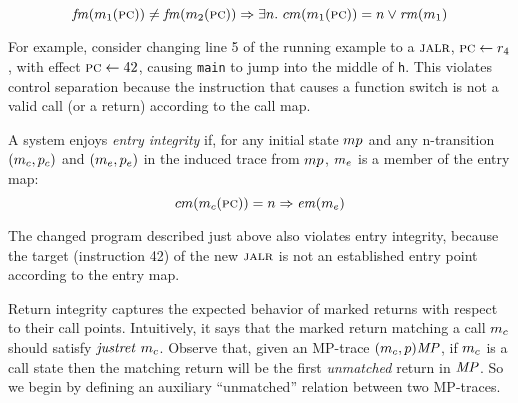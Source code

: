\documentclass[acmsmall,review,anonymous]{acmart}\settopmatter{printfolios=true,printccs=false,printacmref=false}
\begin{document}
\[ \mathit{fm}(m_1(\textsc{pc})) \not = \mathit{fm}(m_2(\textsc{pc})) \Rightarrow
\exists n. ~ cm(m_1(\textsc{pc})) = n \vee
\mathit{rm}(m_1) \]

For example, consider changing line 5 of the running example to a $\textsc{jalr}$,
$\textsc{pc} \leftarrow r_4$, with effect $\textsc{pc} \leftarrow 42$, causing {\tt main}
to jump into the middle of {\tt h}.
This violates control separation because the instruction that causes a
function switch is not a valid call (or a return) according to the
call map.

A system enjoys {\em entry integrity}
if, for any initial state $mp$
and any n-transition \((m_c,p_c)\) and
\((m_e, p_e)\) in the induced trace from
$mp$, $m_e$ is a member of the entry map:
\[cm(m_c(\textsc{pc})) = n \Rightarrow \mathit{em}(m_e)\]

The changed program described just above also violates entry integrity,
because the target (instruction 42) of the new $\textsc{jalr}$ is not an established entry point
according to the entry map.


\newcommand*{\Unmatched}{\mathit{um}}

Return integrity captures the expected behavior of marked returns with
respect to their call points. Intuitively, it says that the marked return
matching a call $m_c$ should satisfy $\mathit{justret}\ m_c$.
Observe that, given an MP-trace $(m_c,p)\mathit{MP}$, if $m_c$ is a call state then
the matching return will be the first \emph{unmatched} return in $\mathit{MP}$. So
we begin by defining an auxiliary ``unmatched'' relation between two MP-traces.
\end{document}
